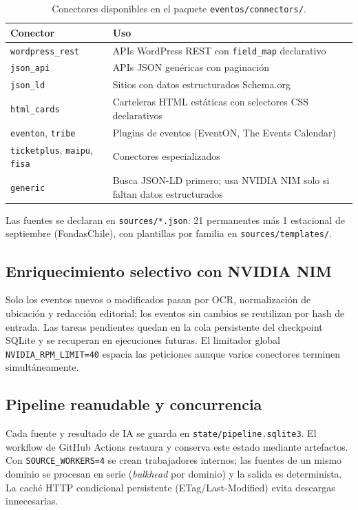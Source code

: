 \begin{table}[ht]
\centering\small
\renewcommand{\arraystretch}{1.2}
\begin{tabular}{l p{9.2cm}}
\toprule
\textbf{Conector} & \textbf{Uso} \\
\midrule
\texttt{wordpress\_rest} & APIs WordPress REST con \texttt{field\_map} declarativo \\
\texttt{json\_api} & APIs JSON genéricas con paginación \\
\texttt{json\_ld} & Sitios con datos estructurados Schema.org \\
\texttt{html\_cards} & Carteleras HTML estáticas con selectores CSS declarativos \\
\texttt{eventon}, \texttt{tribe} & Plugins de eventos (EventON, The Events Calendar) \\
\texttt{ticketplus}, \texttt{maipu}, \texttt{fisa} & Conectores especializados \\
\texttt{generic} & Busca JSON-LD primero; usa NVIDIA NIM solo si faltan datos estructurados \\
\bottomrule
\end{tabular}
\caption{Conectores disponibles en el paquete \texttt{eventos/connectors/}.}
\label{tab:conn}
\end{table}

Las fuentes se declaran en \texttt{sources/*.json}: 21 permanentes más 1 estacional de
septiembre (FondasChile), con plantillas por familia en
\texttt{sources/templates/}.

\subsection{Enriquecimiento selectivo con NVIDIA NIM}

Solo los eventos nuevos o modificados pasan por OCR, normalización de ubicación y redacción
editorial; los eventos sin cambios se reutilizan por hash de entrada. Las tareas pendientes
quedan en la cola persistente del checkpoint SQLite y se recuperan en ejecuciones futuras.
El limitador global \texttt{NVIDIA\_RPM\_LIMIT=40} espacia las peticiones aunque varios
conectores terminen simultáneamente.

\subsection{Pipeline reanudable y concurrencia}

Cada fuente y resultado de IA se guarda en \texttt{state/pipeline.sqlite3}. El workflow
de GitHub Actions restaura y conserva este
estado mediante artefactos. Con \texttt{SOURCE\_WORKERS=4} se crean trabajadores internos;
las fuentes de un mismo dominio se procesan en serie (\emph{bulkhead} por dominio) y la
salida es determinista. La caché HTTP condicional persistente (ETag/Last-Modified) evita
descargas innecesarias.

